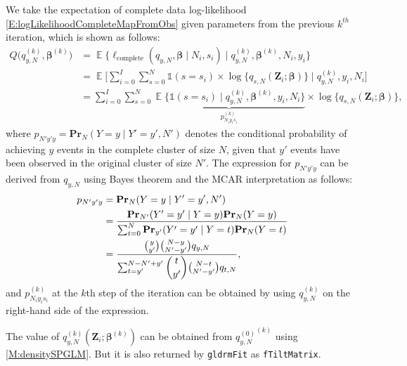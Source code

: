 \documentclass[reqno]{amsart}
\DeclareMathOperator{\E}{\mathbb{E}}
\begin{document}
We take the expectation of complete data log-likelihood \eqref{E:logLikelihoodCompleteMapFromObs} given parameters from the previous $k^{th}$ iteration, which is shown as follows:
\begin{equation}\label{E:ExpectedlogLikelihoodCompleteMapFromObs}
\begin{split}
    Q \bigg( q_{y,N}^{(k)}, \boldsymbol{\beta}^{(k)} \bigg) &= 
     \E \bigg\{ \ell_{\text{complete}} (q_{y,N}, \boldsymbol{\beta} \mid N_i, s_i) \mid q_{y,N}^{(k)}, \boldsymbol{\beta}^{(k)}, N_i, y_i \bigg\} \\
    &= \E \Bigg[ \sum_{i=0}^I \sum_{s=0}^N {\mathds{1}}(s=s_i) \times \log \{ q_{s,N}(\boldsymbol{Z}_i; \boldsymbol{\beta}) \} \mid q_{y,N}^{(k)}, y_i,N_i \Bigg] \\
    &= \sum_{i=0}^I \sum_{s=0}^N \underbrace{ \E \big\{ {\mathds{1}}(s=s_i) \mid q_{y,N}^{(k)}, \boldsymbol{\beta}^{(k)}, y_i, N_i \big\}}_{p_{N_iy_is_i}^{(k)}} \times \log \{q_{s,N}(\boldsymbol{Z}_i; \boldsymbol{\beta}) \},
\end{split}
\end{equation}
where $p_{N'y'y} = \textbf{Pr}_N(Y=y \mid Y'=y',N')$ denotes the conditional probability of achieving $y$ events in the complete cluster of size $N$, given that $y'$ events have been observed in the original cluster of size $N'$. 
The expression for $p_{N'y'y}$ can be derived from $q_{y,N}$ using Bayes theorem and the MCAR interpretation as follows:
\begin{equation}\label{D:prst}
\begin{split}
p_{N'y'y} &= \textbf{Pr}_N(Y=y \mid Y'=y',N') \\ 
          &= \frac{\textbf{Pr}_{N'}(Y'=y' \mid Y=y) \textbf{Pr}_N(Y=y)}{\sum_{t=0}^{N} \textbf{Pr}_{y'}(Y'=y' \mid Y=t) \textbf{Pr}_N(Y=t)} \\ 
          &= \frac{\binom{y}{y'} \binom{N-y}{N'-y'} q_{y,N}}{\sum_{t=y'}^{N-N'+y'} \dbinom{t}{y'} \binom{N-t}{N'-y'} q_{t,N}},
\end{split}
\end{equation}
and $p_{N_iy_is_i}^{(k)}$ at the $k$th step of the iteration can be obtained by using $q_{y,N}^{(k)}$ on the right-hand side of the expression. 

The value of $q_{y,N}^{(k)}(\boldsymbol{Z}_i; \boldsymbol{\beta}^{(k)})$ can be obtained from ${q_{y,N}^{(0)}}^{(k)}$ using \ref{M:densitySPGLM}. But it is also returned by \texttt{gldrmFit} as \texttt{fTiltMatrix}.
\end{document}
